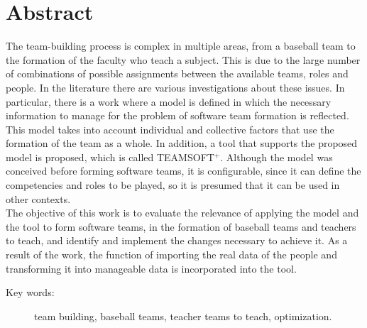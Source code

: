 
\section*{Abstract} 

The team-building process is complex in multiple areas, from a baseball team to the formation of the faculty who teach a subject. This is due to the large number of combinations of possible assignments between the available teams, roles and people. In the literature there are various investigations about these issues. In particular, there is a work where a model is defined in which the necessary information to manage for the problem of software team formation is reflected. This model takes into account individual and collective factors that use the formation of the team as a whole. In addition, a tool that supports the proposed model is proposed, which is called TEAMSOFT$^+$. Although the model was conceived before forming software teams, it is configurable, since it can define the competencies and roles to be played, so it is presumed that it can be used in other contexts.\\

The objective of this work is to evaluate the relevance of applying the model and the tool to form software teams, in the formation of baseball teams and teachers to teach, and identify and implement the changes necessary to achieve it. As a result of the work, the function of importing the real data of the people and transforming it into manageable data is incorporated into the tool.
\begin{description}
	\item[Key words:]{team building, baseball teams, teacher teams to teach, optimization.}
\end{description}